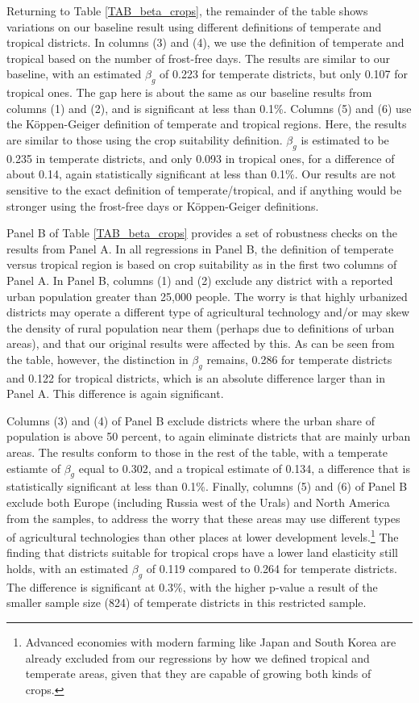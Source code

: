 \documentclass[11pt]{article}
\begin{document}
Returning to Table \ref{TAB_beta_crops}, the remainder of the table shows variations on our baseline result using different definitions of temperate and tropical districts. In columns (3) and (4), we use the definition of temperate and tropical based on the number of frost-free days. The results are similar to our baseline, with an estimated $\beta_g$ of 0.223 for temperate districts, but only 0.107 for tropical ones. The gap here is about the same as our baseline results from columns (1) and (2), and is significant at less than 0.1\%. Columns (5) and (6) use the K{\"o}ppen-Geiger definition of temperate and tropical regions. Here, the results are similar to those using the crop suitability definition. $\beta_g$ is estimated to be 0.235 in temperate districts, and only 0.093 in tropical ones, for a difference of about 0.14, again statistically significant at less than 0.1\%. Our results are not sensitive to the exact definition of temperate/tropical, and if anything would be stronger using the frost-free days or K{\"o}ppen-Geiger definitions.

Panel B of Table \ref{TAB_beta_crops} provides a set of robustness checks on the results from Panel A. In all regressions in Panel B, the definition of temperate versus tropical region is based on crop suitability as in the first two columns of Panel A. In Panel B, columns (1) and (2) exclude any district with a reported urban population greater than 25,000 people. The worry is that highly urbanized districts may operate a different type of agricultural technology and/or may skew the density of rural population near them (perhaps due to definitions of urban areas), and that our original results were affected by this. As can be seen from the table, however, the distinction in $\beta_g$ remains, 0.286 for temperate districts and 0.122 for tropical districts, which is an absolute difference larger than in Panel A. This difference is again significant.

Columns (3) and (4) of Panel B exclude districts where the urban share of population is above 50 percent, to again eliminate districts that are mainly urban areas. The results conform to those in the rest of the table, with a temperate estiamte of $\beta_g$ equal to 0.302, and a tropical estimate of 0.134, a difference that is statistically significant at less than 0.1\%. Finally, columns (5) and (6) of Panel B exclude both Europe (including Russia west of the Urals) and North America from the samples, to address the worry that these areas may use different types of agricultural technologies than other places at lower development levels.\footnote{Advanced economies with modern farming like Japan and South Korea are already excluded from our regressions by how we defined tropical and temperate areas, given that they are capable of growing both kinds of crops.} The finding that districts suitable for tropical crops have a lower land elasticity still holds, with an estimated $\beta_g$ of 0.119 compared to 0.264 for temperate districts. The difference is significant at 0.3\%, with the higher p-value a result of the smaller sample size (824) of temperate districts in this restricted sample.
\end{document}

